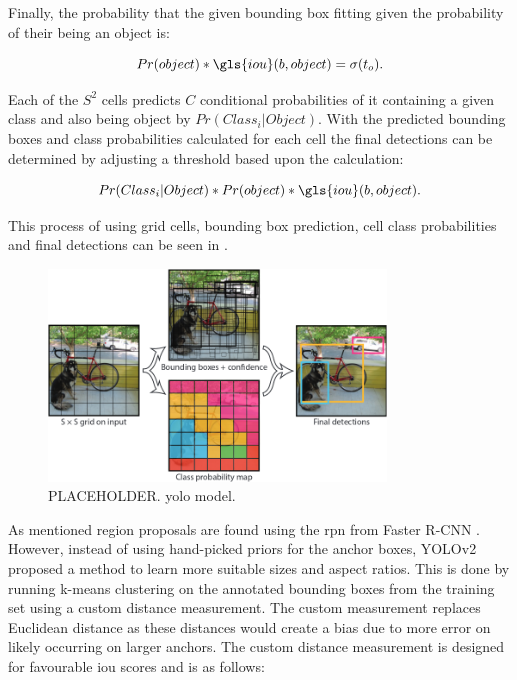 Finally, the probability that the given bounding box fitting given the probability of their being an object is:

\begin{equation}  
  Pr(object) * \gls{iou}(b, object) = \sigma(t_o).  
\end{equation}

Each of the $S^2$ cells predicts $C$ conditional probabilities of it containing a given class and also being object by $Pr(Class_i \rvert Object)$. With the predicted bounding boxes and class probabilities calculated for each cell the final detections can be determined by adjusting a threshold based upon the calculation:

\begin{equation}
  Pr(Class_i \rvert Object) *  Pr(object) * \gls{iou}(b, object). 
\end{equation}

This process of using grid cells, bounding box prediction, cell class probabilities and final detections can be seen in .

\begin{figure}[H]
  \centering
    \includegraphics[width=0.8\textwidth]{Figs/Techanal/yolomodel.png}
      \caption{PLACEHOLDER. \gls{yolo} model.}
    \label{fig:yolomodel}
\end{figure}

As mentioned region proposals are found using the \gls{rpn} from Faster R-CNN \cite{fasterrcnn}. However, instead of using hand-picked priors for the anchor boxes, YOLOv2 proposed a method to learn more suitable sizes and aspect ratios. This is done by running k-means clustering on the annotated bounding boxes from the training set using a custom distance measurement. The custom measurement replaces Euclidean distance as these distances would create a bias due to more error on likely occurring on larger anchors. The custom distance measurement is designed for favourable \gls{iou} scores and is as follows:

